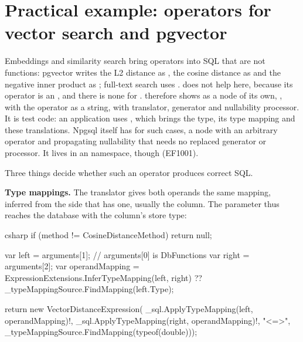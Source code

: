 \section{Practical example: operators for vector search and pgvector}

Embeddings and similarity search bring operators into SQL that are not functions: pgvector
writes the L2 distance as \code{<->}, the cosine distance as
\code{<=>} and the negative inner product as
\code{<\#>}; full-text search uses .
 does not help here, because its operator
is an , and there is none for
\code{<=>}. 
therefore shows
 as a node of its own, , with the
operator as a string, with translator, generator and nullability processor. It is test code:
an application uses ,
which brings the  type, its type mapping and these translations. Npgsql itself has
 for such cases, a node
with an arbitrary operator and propagating nullability that needs no replaced generator or
processor. It lives in an  namespace, though (EF1001).

Three things decide whether such an operator produces correct SQL.

\textbf{Type mappings.} The translator gives both operands the same mapping, inferred from the
side that has one, usually the column. The parameter thus reaches the database with the
column's store type:

\begin{sourcecode}{csharp}
if (method != CosineDistanceMethod)
    return null;

var left = arguments[1];                        // arguments[0] is DbFunctions
var right = arguments[2];
var operandMapping = ExpressionExtensions.InferTypeMapping(left, right)
                     ?? _typeMappingSource.FindMapping(left.Type);

return new VectorDistanceExpression(
    _sql.ApplyTypeMapping(left, operandMapping)!,
    _sql.ApplyTypeMapping(right, operandMapping)!,
    "<=>",
    _typeMappingSource.FindMapping(typeof(double)));
\end{sourcecode}

